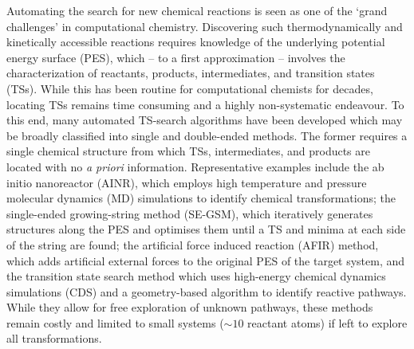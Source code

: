 \documentclass[../../main.tex]{subfiles}
\begin{document}
Automating the search for new chemical reactions is seen as one of the ‘grand challenges’ in computational chemistry.\cite{Grimme2018, Foscato2020} Discovering such thermodynamically and kinetically accessible reactions requires knowledge of the underlying potential energy surface (PES), which -- to a first approximation -- involves the characterization of reactants, products, intermediates, and transition states (TSs).\cite{Cheng2015, Sameera2012, Kozuch2011} While this has been routine for computational chemists for decades, locating TSs remains time consuming and a highly non-systematic endeavour.\cite{Simm2019} To this end, many automated TS-search algorithms have been developed which may be broadly classified into single and double-ended methods.\cite{Jensen2020, Dewyer2018} The former requires a single chemical structure from which TSs, intermediates, and products are located with no \emph{a priori} information. Representative examples include the ab initio nanoreactor (AINR),\cite{Wang2014} which employs high temperature and pressure molecular dynamics (MD) simulations to identify chemical transformations; the single-ended growing-string method (SE-GSM),\cite{Zimmerman2015} which iteratively generates structures along the PES and optimises them until a TS and minima at each side of the string are found; the artificial force induced reaction (AFIR) method,\cite{Maeda2016} which adds artificial external forces to the original PES of the target system, and the transition state search method which uses high-energy chemical dynamics simulations (CDS) and a geometry-based algorithm to identify reactive pathways.\cite{Martinez-Nunez2015} While they allow for free exploration of unknown pathways, these methods remain costly and limited to small systems ($\sim10$ reactant atoms) if left to explore all transformations.
\\\\
\end{document}
